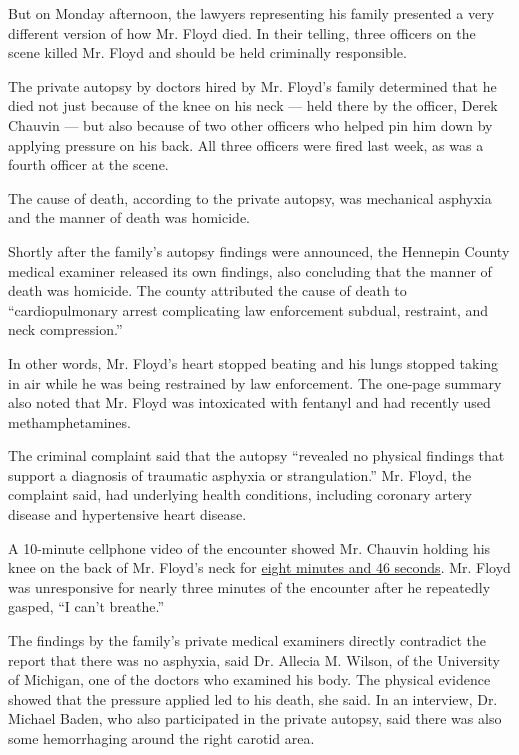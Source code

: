 But on Monday afternoon, the lawyers representing his family presented a
very different version of how Mr. Floyd died. In their telling, three
officers on the scene killed Mr. Floyd and should be held criminally
responsible.

The private autopsy by doctors hired by Mr. Floyd's family determined
that he died not just because of the knee on his neck --- held there by
the officer, Derek Chauvin --- but also because of two other officers
who helped pin him down by applying pressure on his back. All three
officers were fired last week, as was a fourth officer at the scene.

The cause of death, according to the private autopsy, was mechanical
asphyxia and the manner of death was homicide.

Shortly after the family's autopsy findings were announced, the Hennepin
County medical examiner released its own findings, also concluding that
the manner of death was homicide. The county attributed the cause of
death to ``cardiopulmonary arrest complicating law enforcement subdual,
restraint, and neck compression.''

In other words, Mr. Floyd's heart stopped beating and his lungs stopped
taking in air while he was being restrained by law enforcement. The
one-page summary also noted that Mr. Floyd was intoxicated with fentanyl
and had recently used methamphetamines.

The criminal complaint said that the autopsy ``revealed no physical
findings that support a diagnosis of traumatic asphyxia or
strangulation.'' Mr. Floyd, the complaint said, had underlying health
conditions, including coronary artery disease and hypertensive heart
disease.

A 10-minute cellphone video of the encounter showed Mr. Chauvin holding
his knee on the back of Mr. Floyd's neck for
\href{https://www.nytimes3xbfgragh.onion/video/us/100000007159353/george-floyd-arrest-death-video.html}{eight
minutes and 46 seconds}. Mr. Floyd was unresponsive for nearly three
minutes of the encounter after he repeatedly gasped, ``I can't
breathe.''

The findings by the family's private medical examiners directly
contradict the report that there was no asphyxia, said Dr. Allecia M.
Wilson, of the University of Michigan, one of the doctors who examined
his body. The physical evidence showed that the pressure applied led to
his death, she said. In an interview, Dr. Michael Baden, who also
participated in the private autopsy, said there was also some
hemorrhaging around the right carotid area.


